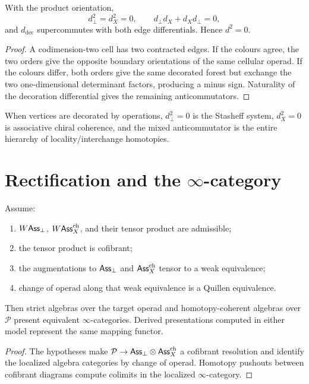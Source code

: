 \begin{theorem}\label{thm:mixed-boundary}
With the product orientation,
\[
 d_\perp^2=d_X^2=0,
 \qquad d_\perp d_X+d_Xd_\perp=0,
\]
and \(d_{\mathrm{dec}}\) supercommutes with both edge differentials.  Hence \(d^2=0\).
\end{theorem}
\begin{proof}
A codimension-two cell has two contracted edges.  If the colours agree, the two orders give the opposite boundary orientations of the same cellular operad.  If the colours differ, both orders give the same decorated forest but exchange the two one-dimensional determinant factors, producing a minus sign.  Naturality of the decoration differential gives the remaining anticommutators.
\end{proof}

When vertices are decorated by operations, \(d_\perp^2=0\) is the Stasheff system, \(d_X^2=0\) is associative chiral coherence, and the mixed anticommutator is the entire hierarchy of locality/interchange homotopies.

\section{Rectification and the \(\infty\)-category}
\begin{theorem}\label{thm:cofibrant-comparison}
Assume:
\begin{enumerate}
\item \(W\mathsf{Ass}_\perp\), \(W\mathsf{Ass}^{\mathrm{ch}}_X\), and their tensor product are admissible;
\item the tensor product is cofibrant;
\item the augmentations to \(\mathsf{Ass}_\perp\) and \(\mathsf{Ass}^{\mathrm{ch}}_X\) tensor to a weak equivalence;
\item change of operad along that weak equivalence is a Quillen equivalence.
\end{enumerate}
Then strict algebras over the target operad and homotopy-coherent algebras over \(\mathcal P\) present equivalent \(\infty\)-categories.  Derived presentations computed in either model represent the same mapping functor.
\end{theorem}
\begin{proof}
The hypotheses make \(\mathcal P\to\mathsf{Ass}_\perp\otimes\mathsf{Ass}^{\mathrm{ch}}_X\) a cofibrant resolution and identify the localized algebra categories by change of operad.  Homotopy pushouts between cofibrant diagrams compute colimits in the localized \(\infty\)-category.
\end{proof}

